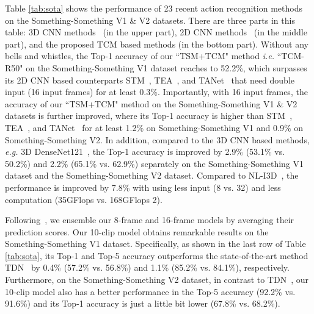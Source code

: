 \documentclass[journal]{IEEEtran}
\begin{document}
Table \ref{tab:sota} shows the performance of 23 recent action recognition methods on the Something-Something V1 \& V2 datasets. There are three parts in this table: 3D CNN methods~\cite{zolfaghari2018eco,wang2018videos,xie2018rethinking,martinez2019action} (in the upper part), 2D CNN methods~\cite{wang2016temporal,zhou2018temporal,lee2018motion,liu2019learning,jiang2019stm,li2020tea,kwon2020motionsqueeze} (in the middle part), and the proposed TCM based methods (in the bottom part). Without any bells and whistles, the Top-1 accuracy of our ``TSM+TCM" method \textit{i.e.} ``TCM-R50" on the Something-Something V1 dataset reaches to 52.2\%, which surpasses its 2D CNN based counterparts STM~\cite{jiang2019stm}, TEA~\cite{li2020tea}, and TANet~\cite{liu2020tam} that need double input (16 input frames) for at least 0.3\%. Importantly, with 16 input frames, the accuracy of our ``TSM+TCM" method on the Something-Something V1 \& V2 datasets is further improved, where its Top-1 accuracy is higher than STM~\cite{jiang2019stm}, TEA~\cite{li2020tea}, and TANet~\cite{liu2020tam} for at least 1.2\% on Something-Something V1 and 0.9\% on Something-Something V2. In addition, compared to the 3D CNN based methods, \textit{e.g.} 3D DenseNet121~\cite{zhou2020spatiotemporal}, the Top-1 accuracy is improved by 2.9\% (53.1\% vs. 50.2\%) and 2.2\% (65.1\% vs. 62.9\%) separately on the Something-Something V1 dataset and the Something-Something V2 dataset. Compared to NL-I3D~\cite{wang2018videos}, the performance is improved by 7.8\% with using less input (8 vs. 32) and less computation (35GFlops vs. 168GFlops  2).

Following~\cite{lin2019tsm,kwon2020motionsqueeze}, we ensemble our 8-frame and 16-frame models by averaging their prediction scores.
Our 10-clip model obtains remarkable results on the Something-Something V1 dataset. Specifically, as shown in the last row of Table \ref{tab:sota}, its Top-1 and Top-5 accuracy outperforms the state-of-the-art method TDN~\cite{wang2021tdn} by 0.4\% (57.2\% vs. 56.8\%) and 1.1\% (85.2\% vs. 84.1\%), respectively. Furthermore, on the Something-Something V2 dataset, in contrast to TDN~\cite{wang2021tdn}, our 10-clip model also has a better performance in the Top-5 accuracy (92.2\% vs. 91.6\%) and its Top-1 accuracy is just a little bit lower (67.8\% vs. 68.2\%).
\end{document}
